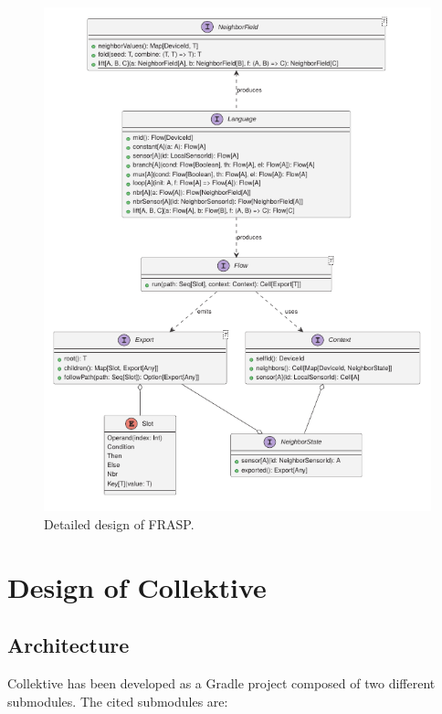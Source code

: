 \begin{figure}
    \centering
    \includegraphics[width=\linewidth]{figures/FRASP-design.pdf}
    \caption{Detailed design of FRASP.}
    \label{fig:frasp-design}
\end{figure}

\section{Design of Collektive}
\label{section:design-of-collektive}

\subsection{Architecture}

Collektive has been developed as a Gradle project composed of two different submodules. The cited submodules are:

